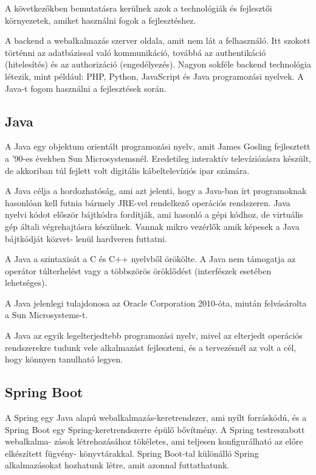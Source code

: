 
A következőkben bemutatásra kerülnek azok a technológiák és fejlesztői környezetek, amiket használni fogok a fejlesztéshez.


A backend a webalkalmazás szerver oldala, amit nem lát a felhasználó. Itt szokott történni az adatbázissal való kommunikáció, továbbá az authentikáció (hitelesítés) és az authorizáció (engedélyezés). Nagyon sokféle backend technológia létezik, mint például: PHP, Python, JavaScript és Java programozási nyelvek. A Java-t fogom használni a fejlesztések során.

\subsection{Java}

A Java \cite{Java} egy objektum orientált programozási nyelv, amit James Gosling fejlesztett a ’90-es években Sun Microsystemsnél. Eredetileg interaktív televíziózásra készült, de akkoriban túl fejlett volt digitális kábeltelevíziós ipar számára.

A Java célja a hordozhatóság, ami azt jelenti, hogy a Java-ban írt programoknak hasonlóan kell futnia bármely JRE-vel rendelkező operációs rendszeren. Java nyelvi kódot először bájtkódra fordítják, ami hasonló a gépi kódhoz, de virtuális gép általi végrehajtásra készülnek. Vannak mikro vezérlők amik képesek a Java bájtkódját közvet-
lenül hardveren futtatni.

A Java a szintaxisát a C és C++ nyelvből örökölte. A Java nem támogatja az operátor túlterhelést vagy a többszörös öröklődést (interfészek esetében lehetséges).

A Java jelenlegi tulajdonosa az Oracle Corporation 2010-óta, miután felvásárolta a Sun Microsystems-t.

A Java az egyik legelterjedtebb programozási nyelv, mivel az elterjedt operációs rendszerekre tudunk vele alkalmazást fejleszteni, és a tervezésnél az volt a cél, hogy könnyen tanulható legyen.

\subsection{Spring Boot}

A Spring egy Java alapú webalkalmazás-keretrendszer, ami nyílt forráskódú, és a Spring Boot egy Spring-keretrendszerre épülő bővítmény. A Spring testreszabott webalkalma-
zások létrehozásához tökéletes, ami teljesen konfigurálható az előre elkészített fügvény-
könyvtárakkal. Spring Boot-tal különálló Spring alkalmazásokat hozhatunk létre, amit azonnal futtathatunk.

